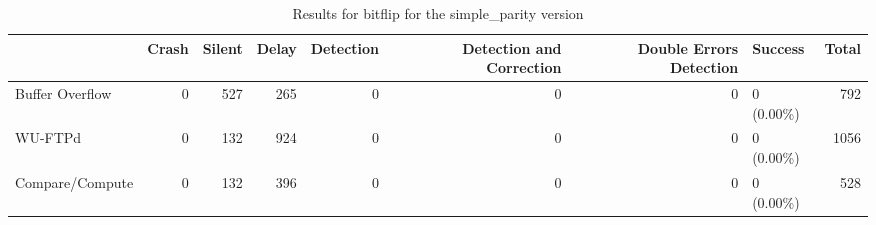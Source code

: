 \begin{table}[t]
	\centering
	\caption{Results for bitflip for the simple_parity version}
	\label{table:end_sim_by_status_simple_parity_1_bitflip}
	\begin{tabular}{lrrrrrrlr}
		\toprule
		                & Crash & Silent & Delay & Detection & Detection and Correction & Double Errors Detection & Success    & Total \\
		\midrule
		Buffer Overflow & 0     & 527    & 265   & 0         & 0                        & 0                       & 0 (0.00\%) & 792   \\
		WU-FTPd         & 0     & 132    & 924   & 0         & 0                        & 0                       & 0 (0.00\%) & 1056  \\
		Compare/Compute & 0     & 132    & 396   & 0         & 0                        & 0                       & 0 (0.00\%) & 528   \\
		\bottomrule
	\end{tabular}
\end{table}
